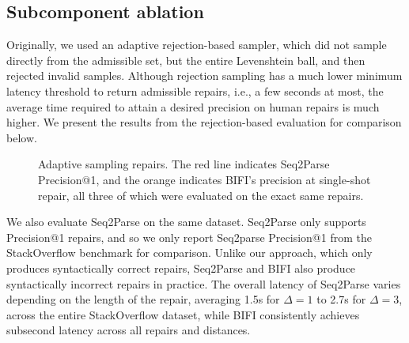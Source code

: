 \documentclass[sigplan,acmsmall,nonacm,screen]{acmart}\settopmatter{printfolios=false,printccs=false,printacmref=false}
\begin{document}

  \clearpage\subsection{Subcomponent ablation}\label{sec:rq3}

  Originally, we used an adaptive rejection-based sampler, which did not sample directly from the admissible set, but the entire Levenshtein ball, and then rejected invalid samples. Although rejection sampling has a much lower minimum latency threshold to return admissible repairs, i.e., a few seconds at most, the average time required to attain a desired precision on human repairs is much higher. We present the results from the rejection-based evaluation for comparison below.

  \begin{figure}[H]
    \resizebox{.24\textwidth}{!}{}
    \resizebox{.25\textwidth}{!}{}
    \resizebox{.24\textwidth}{!}{}
    \resizebox{.24\textwidth}{!}{}
    \caption{Adaptive sampling repairs. The red line indicates Seq2Parse Precision@1, and the orange indicates BIFI's precision at single-shot repair, all three of which were evaluated on the exact same repairs.}\label{fig:adaptive}
  \end{figure}

  We also evaluate Seq2Parse on the same dataset. Seq2Parse only supports Precision@1 repairs, and so we only report Seq2parse Precision@1 from the StackOverflow benchmark for comparison. Unlike our approach, which only produces syntactically correct repairs, Seq2Parse and BIFI also produce syntactically incorrect repairs in practice. The overall latency of Seq2Parse varies depending on the length of the repair, averaging 1.5s for $\Delta=1$ to 2.7s for $\Delta=3$, across the entire StackOverflow dataset, while BIFI consistently achieves subsecond latency across all repairs and distances.
\end{document}
